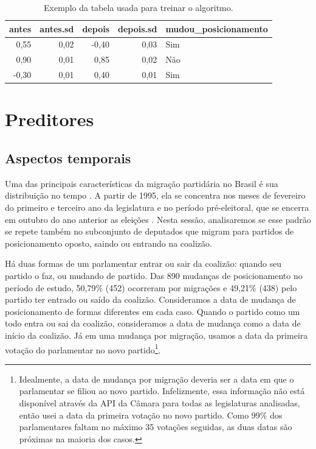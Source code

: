 \documentclass[a4paper,titlepage]{ppgi}\usepackage[]{graphicx}\usepackage[]{color}
\newenvironment{knitrout}{}{} %
\begin{document}
\begin{table}
\centering
\begin{knitrout}
\color{fgcolor}
\begin{tabular}{r|r|r|r|l}
\hline
antes & antes.sd & depois & depois.sd & mudou\_posicionamento\\
\hline
0,55 & 0,02 & -0,40 & 0,03 & Sim\\
\hline
0,90 & 0,01 & 0,85 & 0,02 & Não\\
\hline
-0,30 & 0,01 & 0,40 & 0,01 & Sim\\
\hline
\end{tabular}


\end{knitrout}
\caption{Exemplo da tabela usada para treinar o algoritmo.}
\label{table:dataset-final}
\end{table}


\section{Preditores}

\subsection{Aspectos temporais}



Uma das principais características da migração partidária no Brasil é sua
distribuição no tempo \cite{Araujo2000,Melo2004,Freitas2008}. A partir de 1995,
ela se concentra nos meses de fevereiro do primeiro e terceiro ano da
legislatura e no período pré-eleitoral, que se encerra em outubro do ano
anterior as eleições \cite{Freitas2008,Lei9504/1997}. Nesta sessão,
analisaremos se esse padrão se repete também no subconjunto de deputados que
migram para partidos de posicionamento oposto, saindo ou entrando na coalizão.

Há duas formas de um parlamentar entrar ou sair da coalizão: quando seu partido
o faz, ou mudando de partido. Das 890 mudanças de
posicionamento no período de estudo,
50,79\% (452)
ocorreram por migrações e
49,21\% (438)
pelo partido ter entrado ou saído da coalizão. Consideramos a data de mudança
de posicionamento de formas diferentes em cada caso. Quando o partido como um
todo entra ou sai da coalizão, consideramos a data de mudança como a data de
início da coalizão. Já em uma mudança por migração, usamos a data da primeira
votação do parlamentar no novo partido\footnote{Idealmente, a data de mudança
por migração deveria ser a data em que o parlamentar se filiou ao novo partido.
Infelizmente, essa informação não está disponível através da \gls{API} da
Câmara para todas as legislaturas analisadas, então usei a data da primeira
votação no novo partido. Como 99\% dos parlamentares faltam no máximo 35
votações seguidas, as duas datas são próximas na maioria dos casos.}.
\end{document}
